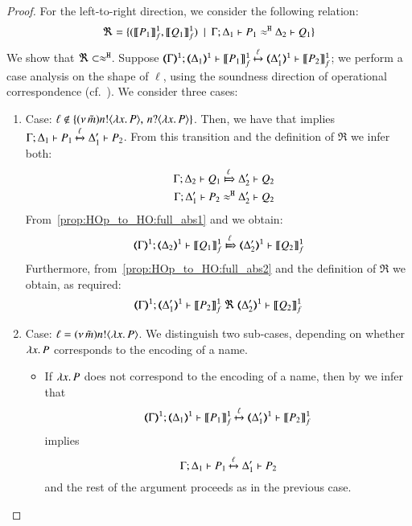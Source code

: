 \begin{proof}
	\noi For the left-to-right direction, we consider the following relation:
%
	\[
		\Re = \{
		(\llbracket P_1\rrbracket^\mathtt{1}_f, \llbracket Q_1\rrbracket^\mathtt{1}_f)
		\ \ |\ \  \Gamma; \Delta_1 \vdash P_1 \approx^\mathtt{H} \Delta_2 \vdash Q_1\}
	\]
%
	We show that $\Re \subset \approx^\mathtt{H}$.
	Suppose $\horel{\tmap{\Gamma}{1}}{\tmap{\Delta_1}{1}}{\pmapp{P_1}{1}{f}}{\hby{\ell}}{\tmap{\Delta_1'}{1}}{\pmapp{P_2}{1}{f}}$; 
we perform a case analysis on the shape of ${\ell}$, using 
the soundness direction of operational correspondence (cf.~).
			We consider three cases:
	\begin{enumerate}[1.]

	\item Case: $\ell \notin \{(\nu\, \tilde{m}) n ! \langle \lambda x.\,P \rangle,\, n ? \langle \lambda x.\,P \rangle\}$.
	Then, we have that 
	 implies
		$\Gamma; \Delta_1 \vdash P_1 \xmapsto{\ell} \Delta_1' \vdash P_2$. 
From this transition and the definition of $\Re$ we infer both:
%
	\begin{eqnarray}
		&&\horel{\Gamma}{\Delta_2}{Q_1}{\Hby{\ell}}{\Delta_2'}{Q_2}
		\label{prop:HOp_to_HO:full_abs1}
		\\
		&&\horel{\Gamma}{\Delta_1'}{P_2}{\hwb}{\Delta_2'}{Q_2}
		\label{prop:HOp_to_HO:full_abs2}
	\end{eqnarray}
%
	\noi From~\eqref{prop:HOp_to_HO:full_abs1} and  we obtain:
%
	\[
		\horel{\tmap{\Gamma}{1}}{\tmap{\Delta_2}{1}}{\pmapp{Q_1}{1}{f}}{\Hby{\ell}}{\tmap{\Delta_2'}{1}}{\pmapp{Q_2}{1}{f}}
	\]
%
	\noi Furthermore, from~\eqref{prop:HOp_to_HO:full_abs2} and the definition of $\Re$ we obtain, as required:
%
	\[
		\horel{\tmap{\Gamma}{1}}{\tmap{\Delta_1'}{1}}{\pmapp{P_2}{1}{f}}{\ \Re\ }{\tmap{\Delta_2'}{1}}{\pmapp{Q_2}{1}{f}}
	\]
	\item Case: $\ell = (\nu\, \tilde{m}) n ! \langle \lambda x.\,P \rangle$.
    We distinguish two sub-cases, depending on whether $\lambda x.\,P$ corresponds to the encoding of a name. 
    \begin{itemize}
    \item If $\lambda x.\,P$  does not correspond to the encoding of a name, then 
	by  we infer that
%
	\[
		\horel{\tmap{\Gamma}{1}}{\tmap{\Delta_1}{1}}{\pmapp{P_1}{1}{f}}{\hby{\ell}}{\tmap{\Delta_1'}{1}}{\pmapp{P_2}{1}{f}}
	\]
%
	\noi implies
%
	\[
		\Gamma; \Delta_1 \vdash P_1 \xmapsto{\ell} \Delta_1' \vdash P_2
	\]
%
	and the rest of the argument proceeds as in the previous case.


\end{itemize}
\end{enumerate}
\end{proof}
